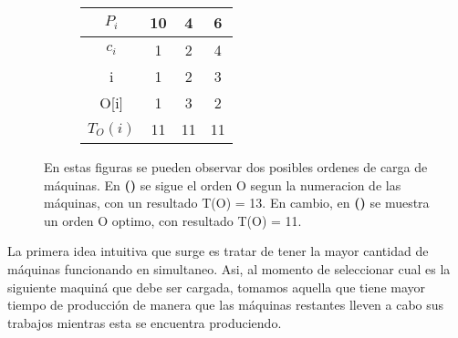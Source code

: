 \begin{figure}
\begin{center}
\begin{minipage}[c]{\figurewidth}
\begin{center}
                \begin{subfigure}{.3\textwidth}
                    \centering
                    \begin{tabular}[c]{|c|c|c|c|}
                        \hline
                        $P_i$ & 10 & 4 & 6 \\
                        \hline
                        $c_i$ &  1 & 2 & 4  \\
                        \hline
                        \rowcolor[gray]{.9}
                        i & 1 & 2 & 3  \\
                        \hline
                        \rowcolor[gray]{.9}
                        O[i] & 1 & 3 & 2  \\
                        \hline
                    		\rowcolor[gray]{.9}
                        $T_{O}(i)$ & 11 & 11 & 11  \\
                        \hline
                    \end{tabular}
                    \caption{ }
                    \label{fig:ej1optimo}
                \vspace{2ex}
                \end{subfigure}
                
             \caption{En estas figuras se pueden observar dos posibles ordenes de carga de m\'aquinas. En \textbf{()} se
             					sigue el orden O segun la numeracion de las m\'aquinas, con un resultado T(O) = 13. En cambio, en \textbf{()} 
             					se muestra un orden O optimo, con resultado T(O) = 11.
             					}   
             \label{fig:ej1Ejemplos}
            \end{center}
        \end{minipage}
    \end{center}
\end{figure}
 
 
La primera idea intuitiva que surge es tratar de tener la mayor cantidad de m\'aquinas funcionando en simultaneo.
Asi, al momento de seleccionar cual es la siguiente maquin\'a que debe ser cargada, 
tomamos aquella que tiene mayor tiempo de producci\'on de manera
que las m\'aquinas restantes lleven a cabo sus trabajos mientras esta se encuentra produciendo.

